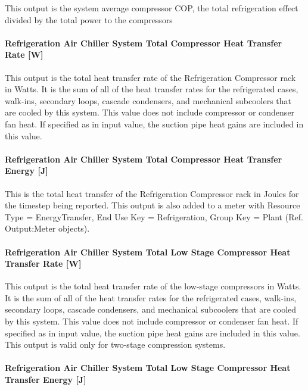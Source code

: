 This output is the system average compressor COP, the total refrigeration effect divided by the total power to the compressors

\paragraph{Refrigeration Air Chiller System Total Compressor Heat Transfer Rate {[}W{]}}\label{refrigeration-air-chiller-system-total-compressor-heat-transfer-rate-w}

This output is the total heat transfer rate of the Refrigeration Compressor rack in Watts. It is the sum of all of the heat transfer rates for the refrigerated cases, walk-ins, secondary loops, cascade condensers, and mechanical subcoolers that are cooled by this system. This value does not include compressor or condenser fan heat. If specified as in input value, the suction pipe heat gains are included in this value.

\paragraph{Refrigeration Air Chiller System Total Compressor Heat Transfer Energy {[}J{]}}\label{refrigeration-air-chiller-system-total-compressor-heat-transfer-energy-j}

This is the total heat transfer of the Refrigeration Compressor rack in Joules for the timestep being reported. This output is also added to a meter with Resource Type = EnergyTransfer, End Use Key = Refrigeration, Group Key = Plant (Ref. Output:Meter objects).

\paragraph{Refrigeration Air Chiller System Total Low Stage Compressor Heat Transfer Rate {[}W{]}}\label{refrigeration-air-chiller-system-total-low-stage-compressor-heat-transfer-rate-w}

This output is the total heat transfer rate of the low-stage compressors in Watts. It is the sum of all of the heat transfer rates for the refrigerated cases, walk-ins, secondary loops, cascade condensers, and mechanical subcoolers that are cooled by this system. This value does not include compressor or condenser fan heat. If specified as in input value, the suction pipe heat gains are included in this value.~ This output is valid only for two-stage compression systems.

\paragraph{Refrigeration Air Chiller System Total Low Stage Compressor Heat Transfer Energy {[}J{]}}\label{refrigeration-air-chiller-system-total-low-stage-compressor-heat-transfer-energy-j}

